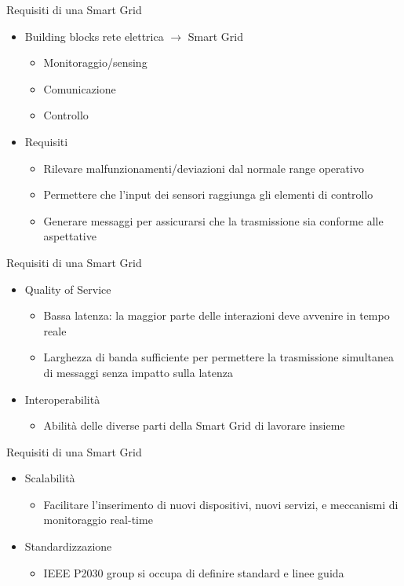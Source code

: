 \begin{frame}{Requisiti di una Smart Grid}
\begin{itemize}[<+- | alert@+>]
\item Building blocks rete elettrica $\rightarrow$ Smart Grid
\begin{itemize}
	\item Monitoraggio/sensing
	\item Comunicazione
	\item Controllo
\end{itemize}
\item Requisiti
\begin{itemize}
\item Rilevare malfunzionamenti/deviazioni dal normale range operativo
\item Permettere che l’input dei sensori raggiunga gli elementi di controllo
\item Generare messaggi per assicurarsi che la trasmissione sia conforme alle aspettative
\end{itemize}
\end{itemize}
\end{frame}


\begin{frame}{Requisiti di una Smart Grid}
\begin{itemize}[<+- | alert@+>]
\item Quality of Service
	\begin{itemize}
		\item Bassa latenza: la maggior parte delle interazioni deve avvenire in tempo reale
		\item Larghezza di banda sufficiente per permettere la trasmissione simultanea di messaggi senza impatto sulla latenza
	\end{itemize}
\item Interoperabilità
	\begin{itemize}
		\item Abilità delle diverse parti della Smart Grid di lavorare insieme
	\end{itemize}
\end{itemize}
\end{frame}

\begin{frame}{Requisiti di una Smart Grid}
\begin{itemize}[<+- | alert@+>]
\item Scalabilità
	\begin{itemize}
		\item Facilitare l’inserimento di nuovi dispositivi, nuovi servizi, e meccanismi di monitoraggio real-time
	\end{itemize}
\item Standardizzazione
	\begin{itemize}
		\item IEEE P2030 group si occupa di definire standard e linee guida
	\end{itemize}
\end{itemize}
\end{frame}

